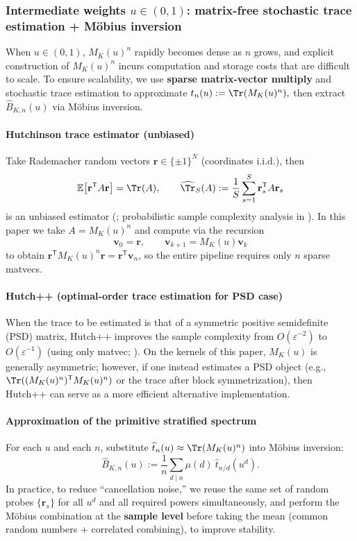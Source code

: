 \subsubsection{Intermediate weights $u\in(0,1)$: matrix-free stochastic trace estimation + M\"{o}bius inversion}
When $u\in(0,1)$, $M_K(u)^n$ rapidly becomes dense as $n$ grows, and explicit construction of $M_K(u)^n$ incurs computation and storage costs that are difficult to scale. To ensure scalability, we use \textbf{sparse matrix-vector multiply} and stochastic trace estimation to approximate
\(
t_n(u):=\Tr(M_K(u)^n),
\)
then extract $\widehat B_{K,n}(u)$ via M\"{o}bius inversion.

\paragraph{Hutchinson trace estimator (unbiased)}
Take Rademacher random vectors $\mathbf r\in\{\pm1\}^N$ (coordinates i.i.d.), then
\[
\mathbb{E}\bigl[\mathbf r^{\mathsf T}A\mathbf r\bigr]=\Tr(A),
\qquad
\widehat{\Tr}_S(A):=\frac{1}{S}\sum_{s=1}^{S}\mathbf r_s^{\mathsf T}A\mathbf r_s
\]
is an unbiased estimator (\cite{Hutchinson1989ASE}; probabilistic sample complexity analysis in \cite{AvronToledo2011Trace}).
In this paper we take $A=M_K(u)^n$ and compute via the recursion
\[
\mathbf v_0=\mathbf r,\qquad \mathbf v_{k+1}=M_K(u)\mathbf v_k
\]
to obtain $\mathbf r^{\mathsf T}M_K(u)^n\mathbf r=\mathbf r^{\mathsf T}\mathbf v_n$, so the entire pipeline requires only $n$ sparse matvecs.

\paragraph{Hutch++ (optimal-order trace estimation for PSD case)}
When the trace to be estimated is that of a symmetric positive semidefinite (PSD) matrix, Hutch++ improves the sample complexity from $O(\varepsilon^{-2})$ to $O(\varepsilon^{-1})$ (using only matvec; \cite{MeyerMuscoMuscoWoodruff2021Hutchpp}).
On the kernels of this paper, $M_K(u)$ is generally asymmetric; however, if one instead estimates a PSD object (e.g., $\Tr((M_K(u)^n)^{\mathsf T}M_K(u)^n)$ or the trace after block symmetrization), then Hutch++ can serve as a more efficient alternative implementation.

\paragraph{Approximation of the primitive stratified spectrum}
For each $u$ and each $n$, substitute $\widehat t_n(u)\approx \Tr(M_K(u)^n)$ into M\"{o}bius inversion:
\[
\widehat B_{K,n}(u):=\frac{1}{n}\sum_{d\mid n}\mu(d)\ \widehat t_{n/d}(u^d).
\]
In practice, to reduce ``cancellation noise,'' we reuse the same set of random probes $\{\mathbf r_s\}$ for all $u^d$ and all required powers simultaneously, and perform the M\"{o}bius combination at the \textbf{sample level} before taking the mean (common random numbers + correlated combining), to improve stability.

